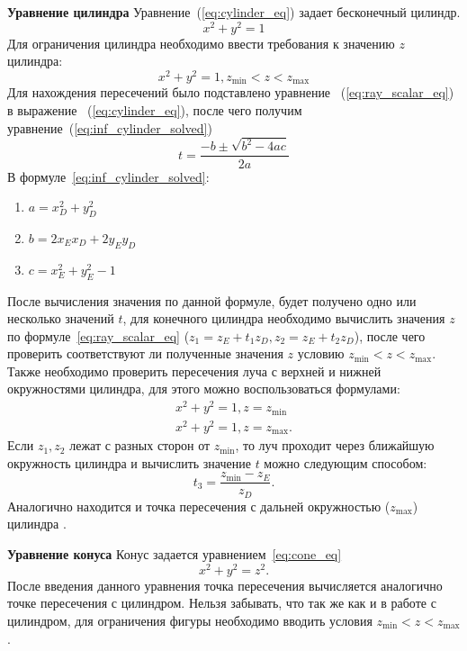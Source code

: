 \textbf{Уравнение цилиндра}
Уравнение~(\ref{eq:cylinder_eq}) задает бесконечный цилиндр.
\begin{equation}
	x^2 + y^2=1
	\label{eq:cylinder_eq}
\end{equation}
Для ограничения цилиндра необходимо ввести требования к значению $z$ цилиндра:
\begin{equation}
	x^2 + y^2=1,z_{\min} < z  < z_{\max}	
	\label{eq:cylinder_eq_demanding}
\end{equation}
Для нахождения пересечений было подставлено уравнение ~(\ref{eq:ray_scalar_eq}) в выражение ~(\ref{eq:cylinder_eq}), после чего получим уравнение~(\ref{eq:inf_cylinder_solved})
\begin{equation}
	t=\frac{-b\pm\sqrt{b^2-4ac}}{2a}
	\label{eq:inf_cylinder_solved}
\end{equation}
В формуле~\ref{eq:inf_cylinder_solved}:
\begin{enumerate}
	\item $a = x_{D}^2 + y_{D}^2$ 
	\item $b = 2x_Ex_D+2y_Ey_D$ 
	\item $c = x_{E}^2+y_{E}^2 - 1$
\end{enumerate}

После вычисления значения по данной формуле, будет получено  одно или несколько значений $t$, для конечного цилиндра необходимо вычислить значения $z$ по
формуле~\ref{eq:ray_scalar_eq} ($z_1 = z_E + t_1z_D,z_2 = z_E + t_2z_D$), после чего проверить соответствуют ли полученные значения $z$ условию $z_{\min} < z  < z_{\max}$.
Также необходимо проверить пересечения луча с верхней и нижней окружностями цилиндра, для этого можно воспользоваться формулами:
\begin{equation}
	\label{eq:cylinder_caps}
	\begin{aligned}
		x^2 + y^2=1,z = z_{\min}\\
		x^2 + y^2=1,z = z_{\max}.
	\end{aligned}
\end{equation}
Если $z_1,z_2$ лежат с разных сторон от $z_{\min}$, то луч проходит через ближайшую окружность цилиндра и вычислить значение $t$ можно следующим способом:
\begin{equation}
	t_3=\frac{z_{\min}-z_E}{z_D}.
	\label{eq:cylinder_caps_solved}
\end{equation}
Аналогично находится и точка пересечения с дальней окружностью ($z_{\max}$) цилиндра \cite{primitives_raytracing_equations}.


\textbf{Уравнение конуса}
Конус задается уравнением~\ref{eq:cone_eq}
\begin{equation}
	x^2+y^2=z^2.
	\label{eq:cone_eq}
\end{equation}
После введения данного уравнения точка пересечения вычисляется аналогично точке пересечения с цилиндром. Нельзя забывать, что так же как и в работе с цилиндром, для
ограничения фигуры необходимо вводить условия $z_{\min} < z < z_{\max}$.

